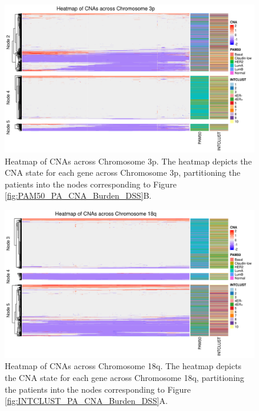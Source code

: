 \begin{figure}[H]
\vspace{0.7cm}
  \centering
  \includegraphics[width=1\textwidth]{../figures/Chapter_3/PA_Ctree_Survival_Burden_DSS_PAM50.png_3p_All_Heatmap.png}
  \caption[Heatmap of CNAs across Chromosome 3p]{Heatmap of CNAs across Chromosome 3p. The heatmap depicts the CNA state for each gene across Chromosome 3p, partitioning the patients into the nodes corresponding to Figure \ref{fig:PAM50_PA_CNA_Burden_DSS}B.}
  \label{PA_SurvTrees_Burden_Heatmaps_3p}
\end{figure}
\vspace{1cm}
\begin{figure}[H]
  \centering
  \includegraphics[width=1\textwidth]{../figures/Chapter_3/PA_PartyKit_Survival_Burden_DSS_INTCLUST.png_18q_All_Heatmap.png}
  \caption[Heatmap of CNAs across Chromosome 18q]{Heatmap of CNAs across Chromosome 18q. The heatmap depicts the CNA state for each gene across Chromosome 18q, partitioning the patients into the nodes corresponding to Figure \ref{fig:INTCLUST_PA_CNA_Burden_DSS}A.}
  \label{PA_SurvTrees_Burden_Heatmaps_18q}
\end{figure} 

